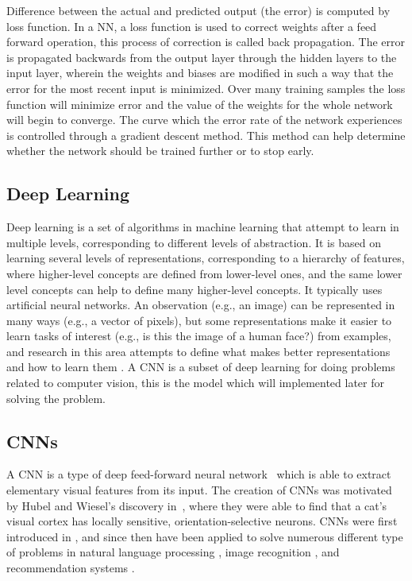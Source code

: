Difference between the actual and predicted output (the error) is computed by loss function. In a NN, a loss function is used to correct weights after a feed forward operation, this process of correction is called back propagation. The error is propagated backwards from the output layer through the hidden layers to the input layer, wherein the weights and biases are modified in such a way that the error for the most recent input is minimized. Over many training samples the loss function will minimize error and the value of the weights for the whole network will begin to converge. The curve which the error rate of the network experiences is controlled through a gradient descent method. This method can help determine whether the network should be trained further or to stop early.


\subsection{Deep Learning}
Deep learning is a set of algorithms in machine learning that attempt to learn in multiple levels, corresponding to different levels of abstraction. It is based on learning several levels of representations, corresponding to a hierarchy of features, where higher-level concepts are defined from lower-level ones, and the same lower level concepts can help to define many higher-level concepts. It typically uses artificial neural networks. An observation (e.g., an image) can be represented in many ways (e.g., a vector of pixels), but some representations make it easier to learn tasks of interest (e.g., is this the image of a human face?) from examples, and research in this area attempts to define what makes better representations and how to learn them \cite{DeepLearning}. A CNN is a subset of deep learning for doing problems related to computer vision, this is the model which will implemented later for solving the problem.

\subsection{CNNs}

A CNN is a type of deep feed-forward neural network~\cite{cnn-star-galaxy} which is able to extract elementary visual features from its input. The creation of CNNs was motivated by Hubel and Wiesel's discovery in~\cite{hubel-wiesel-receptive-fields}, where they were able to find that a cat's visual cortex has locally sensitive, orientation-selective neurons. CNNs were first introduced in \citeyear{Lecun99objectrecognition} \cite{Lecun99objectrecognition}, and since then have been applied to solve numerous different type of problems in  natural language processing \cite{Collobert:2008:UAN:1390156.1390177}, image recognition \cite{cnn-star-galaxy}, and recommendation systems \cite{NIPS2013_5004}.

